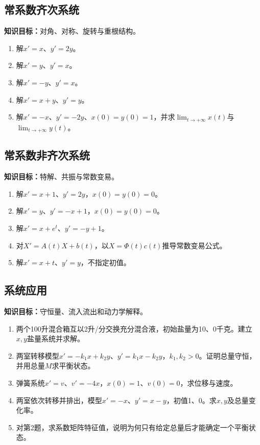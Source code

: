 \documentclass[11pt,a4paper,fontset=fandol]{ctexrep}
\newcommand{\goal}[1]{\textbf{知识目标：}#1\par}
\begin{document}
\subsection{常系数齐次系统}
\goal{对角、对称、旋转与重根结构。}
\begin{enumerate}
\item 解$x'=x$、$y'=2y$。
\item 解$x'=y$、$y'=x$。
\item 解$x'=-y$、$y'=x$。
\item 解$x'=x+y$、$y'=y$。
\item 解$x'=-x$、$y'=-2y$、$x(0)=y(0)=1$，并求$\lim_{t\to+\infty}x(t)$与$\lim_{t\to+\infty}y(t)$。
\end{enumerate}
\subsection{常系数非齐次系统}
\goal{特解、共振与常数变易。}
\begin{enumerate}
\item 解$x'=x+1$、$y'=2y$，$x(0)=y(0)=0$。
\item 解$x'=y$、$y'=-x+1$，$x(0)=y(0)=0$。
\item 解$x'=x+e^t$、$y'=-y+1$。
\item 对$X'=A(t)X+b(t)$，以$X=\Phi(t)c(t)$推导常数变易公式。
\item 解$x'=x+t$、$y'=y$，不指定初值。
\end{enumerate}
\subsection{系统应用}
\goal{守恒量、流入流出和动力学解释。}
\begin{enumerate}
\item 两个100升混合箱互以2升/分交换充分混合液，初始盐量为10、0千克。建立$x,y$盐量系统并求解。
\item 两室转移模型$x'=-k_1x+k_2y$、$y'=k_1x-k_2y$，$k_1,k_2>0$。证明总量守恒，并用总量$M$求平衡状态。
\item 弹簧系统$x'=v$、$v'=-4x$，$x(0)=1$、$v(0)=0$，求位移与速度。
\item 两室依次转移并排出，模型$x'=-x$、$y'=x-y$，初值1、0。求$x,y$及总量变化率。
\item 对第2题，求系数矩阵特征值，说明为何只有给定总量后才能确定一个平衡状态。
\end{enumerate}
\end{document}
